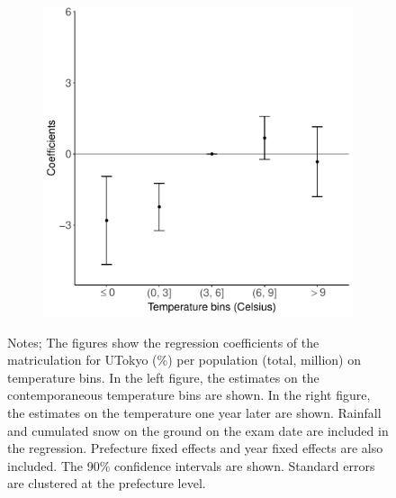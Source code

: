 \documentclass[10pt, pdfmx,hiresbb]{beamer}
\begin{document}
\begin{frame}
\begin{figure}
\begin{minipage}{0.44\textwidth}
\begin{figure}[h]
        \includegraphics[width = \textwidth]{../Output/images/per_pop_reg_f1.pdf}
        \centering
      \end{figure}
    \end{minipage}
    \tiny
    \begin{tablenotes}
    \item Notes;
      The figures show the regression coefficients of the matriculation for UTokyo (\%) per population (total, million) on temperature bins.
      In the left figure, the estimates on the contemporaneous temperature bins are shown.
      In the right figure, the estimates on the temperature one year later are shown.
      Rainfall and cumulated snow on the ground on the exam date are included in the regression.
      Prefecture fixed effects and year fixed effects are also included.
      The 90\% confidence intervals are shown.
      Standard errors are clustered at the prefecture level.
    \end{tablenotes}
  \end{figure}
\end{frame}
\end{document}
